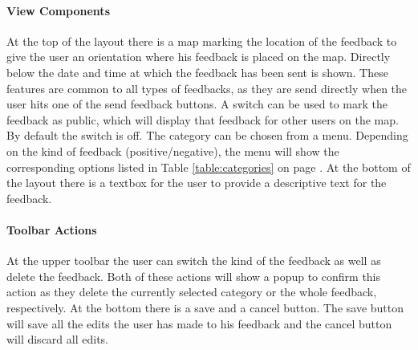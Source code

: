 \paragraph{View Components}
At the top of the layout there is a map marking the location of the feedback to give the user an orientation where his feedback is placed on the map. Directly below the date and time at which the feedback has been sent is shown. These features are common to all types of feedbacks, as they are send directly when the user hits one of the send feedback buttons. \newline
A switch can be used to mark the feedback as public, which will display that feedback for other users on the map. By default the switch is off. \newline
The category can be chosen from a menu. Depending on the kind of feedback (positive/negative), the menu will show the corresponding options listed in Table \ref{table:categories} on page \pageref{table:categories}. At the bottom of the layout there is a textbox for the user to provide a descriptive text for the feedback.

\paragraph{Toolbar Actions}
At the upper toolbar the user can switch the kind of the feedback as well as delete the feedback. Both of these actions will show a popup to confirm this action as they delete the currently selected category or the whole feedback, respectively. \newline
At the bottom there is a save and a cancel button. The save button will save all the edits the user has made to his feedback and the cancel button will discard all edits.
